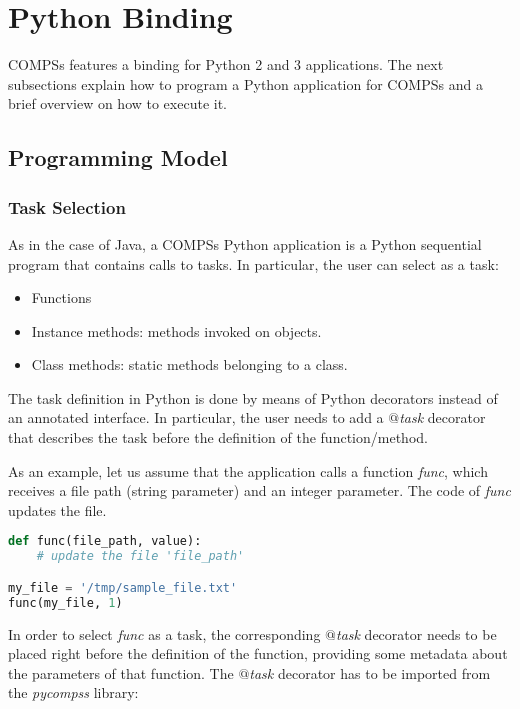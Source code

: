 \section{Python Binding}
\label{sec:Python}

COMPSs features a binding for Python 2 and 3 applications. 
The next subsections explain how to program a Python application for COMPSs and a brief overview on how to execute it.

\subsection{Programming Model}
\label{subsec:Python_programming_model}

\subsubsection{Task Selection}

As in the case of Java, a COMPSs Python application is a Python sequential program that contains calls to tasks. 
In particular, the user can select as a task:

\begin{itemize}
 \item Functions
 \item Instance methods: methods invoked on objects.
 \item Class methods: static methods belonging to a class.
\end{itemize}

The task definition in Python is done by means of Python decorators instead of an annotated interface. 
In particular, the user needs to add a {\it $@$task} decorator that describes the task before the definition of the function/method.

As an example, let us assume that the application calls a function \textit{func}, which receives a file path (string parameter) 
and an integer parameter. The code of \textit{func} updates the file.

\begin{lstlisting}[language=python]
def func(file_path, value):
    # update the file 'file_path'

my_file = '/tmp/sample_file.txt'
func(my_file, 1)
\end{lstlisting}

In order to select {\it func} as a task, the corresponding {\it $@$task} decorator needs to be placed right 
before the definition of the function, providing some metadata about the parameters of that function. 
The {\it $@$task} decorator has to be imported from the {\it pycompss} library:


